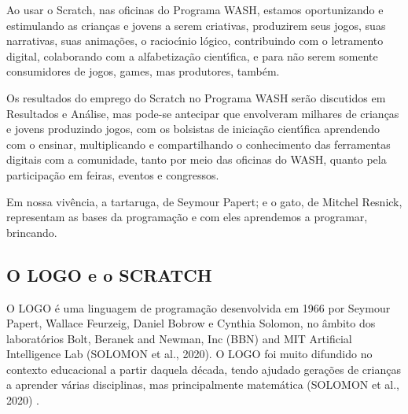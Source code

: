 \documentclass[
12pt,		%
openright,	%
twoside,  %
a4paper,			%
chapter=TITLE,		%
english,			%
french,				%
spanish,			%
brazil				%
]{USPSC-classe/USPSC}
\begin{document}
Ao usar o Scratch, nas oficinas do Programa WASH, estamos oportunizando e estimulando \textquotedbl as crian\c{c}as e jovens a serem criativas, produzirem seus jogos, suas narrativas, suas anima\c{c}\~oes, o racioc\'{\i}nio l\'ogico, contribuindo com o letramento digital, colaborando com a alfabetiza\c{c}\~ao cient\'{\i}fica, e para n\~ao serem somente consumidores de jogos, games, mas produtores, tamb\'em\textquotedbl .









Os resultados do emprego do Scratch no Programa WASH ser\~ao discutidos em Resultados e An\'alise, mas pode-se antecipar que envolveram milhares de crian\c{c}as e jovens produzindo jogos, com os bolsistas de inicia\c{c}\~ao cient\'{\i}fica aprendendo com o ensinar, multiplicando e compartilhando o conhecimento das ferramentas digitais  com a comunidade, tanto por meio das oficinas do WASH, quanto pela participa\c{c}\~ao em feiras, eventos e congressos.









Em nossa viv\^encia, a tartaruga, de Seymour Papert; e o gato, de Mitchel Resnick,  representam as bases da  programa\c{c}\~ao e com eles aprendemos a  programar,  brincando.









\subsection[O LOGO e o SCRATCH]{O LOGO e o SCRATCH}\label{O LOGO e o SCRATCH}
O LOGO \'e uma linguagem de programa\c{c}\~ao desenvolvida em 1966 por Seymour Papert, Wallace Feurzeig, Daniel Bobrow e Cynthia Solomon, no \^ambito dos laborat\'orios Bolt, Beranek and Newman, Inc (BBN) and MIT Artificial Intelligence Lab (SOLOMON et al., 2020). O LOGO foi muito difundido no contexto educacional a partir daquela d\'ecada, tendo ajudado gera\c{c}\~oes de crian\c{c}as a aprender v\'arias disciplinas, mas principalmente matem\'atica  (SOLOMON et al., 2020) .
\end{document}
